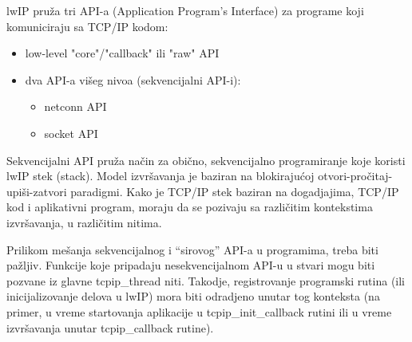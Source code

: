\documentclass[a4paper,12pt, master]{etf}
\begin{document}
	lwIP pru\v{z}a tri API-a (Application Program's Interface) za programe koji
	komuniciraju sa	TCP/IP kodom:
	\begin{itemize}
		\item low-level "core"/"callback" ili "raw" API
		\item dva API-a vi\v{s}eg nivoa (sekvencijalni API-i):
			\begin{itemize}
				\item netconn API
				\item socket API
			\end{itemize}
	\end{itemize}

	Sekvencijalni API pru\v{z}a na\v{c}in za obi\v{c}no, sekvencijalno
	programiranje koje koristi lwIP stek (stack). Model izvr\v{s}avanja je
	baziran na blokiraju\'{c}oj	otvori-pro\v{c}itaj-upi\v{s}i-zatvori
	paradigmi. Kako je TCP/IP stek baziran na dogadjajima, TCP/IP kod i
	aplikativni program, moraju da se pozivaju sa razli\v{c}itim kontekstima
	izvr\v{s}avanja, u razli\v{c}itim nitima.

	Prilikom me\v{s}anja sekvencijalnog i ``sirovog'' API-a u programima, treba
	biti pa\v{z}ljiv. Funkcije koje pripadaju nesekvencijalnom API-u u stvari
	mogu biti pozvane iz glavne	tcpip\_thread niti.
	Takodje, registrovanje programski rutina (ili inicijalizovanje delova u
	lwIP) mora biti	odradjeno unutar tog konteksta (na primer, u vreme
	startovanja aplikacije u tcpip\_init\_callback rutini ili u vreme
	izvr\v{s}avanja unutar tcpip\_callback rutine).
\end{document}
